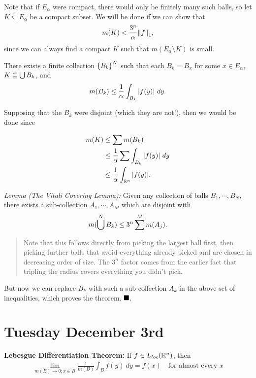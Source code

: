 Note that if \(E_\alpha\) were compact, there would only be finitely
many such balls, so let \(K \subseteq E_\alpha\) be a compact subset. We
will be done if we can show that
\begin{align*}
m(K) < \frac{3^n}{\alpha} {\left\lVert {f} \right\rVert}_1
,\end{align*} since we can always find a compact \(K\) such that
\(m(E_\alpha\setminus K)\) is small.

There exists a finite collection \(\left\{{B_k}\right\}^N\) such that each
\(B_k = B_x\) for some \(x\in E_\alpha\), \(K \subseteq \bigcup B_k\),
and
\begin{align*}
m(B_k) \leq \frac{1}{\alpha} \int_{B_k} {\left\lvert {f(y)} \right\rvert}~dy
.\end{align*}

Supposing that the \(B_k\) were disjoint (which they are not!), then we
would be done since

\begin{align*}
m(K) 
&\leq \sum m(B_k) \\
&\leq \frac{1}{\alpha} \sum \int_{B_k} {\left\lvert {f(y)} \right\rvert} ~dy \\
&\leq \frac{1}{\alpha} \int_{{\mathbb{R}}^n} {\left\lvert {f(y)} \right\rvert}
.\end{align*}

\emph{Lemma (The Vitali Covering Lemma):} Given any collection of balls
\(B_1, \cdots, B_N\), there exists a sub-collection \(A_1, \cdots, A_M\)
which are disjoint with
\begin{align*}
m(\bigcup^N B_k) \leq 3^n \sum^M m(A_j)
.\end{align*}

\begin{quote}
Note that this follows directly from picking the largest ball first,
then picking further balls that avoid everything already picked and are
chosen in decreasing order of size. The \(3^n\) factor comes from the
earlier fact that tripling the radius covers everything you didn't pick.
\end{quote}

But now we can replace \(B_k\) with such a sub-collection \(A_k\) in the
above set of inequalities, which proves the theorem. \(\qed\).

\hypertarget{tuesday-december-3rd}{%
\section{Tuesday December 3rd}\label{tuesday-december-3rd}}

\textbf{Lebesgue Differentiation Theorem:} If \(f\in L_{loc}({\mathbb{R}}^n)\),
then
\begin{align*}
\lim_{m(B) \to 0; x\in B} \frac 1 {m(B)} \int_B f(y) ~dy = f(x) \quad \text{for almost every $x$}
\end{align*}

